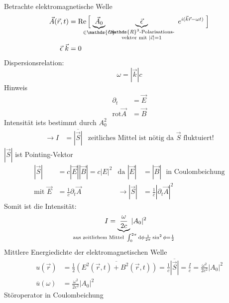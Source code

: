 	Betrachte elektromagnetische Welle
		\begin{align*}
			\vec{A}(\vec{r} , t) &= 
			\mathrm{Re} \left[ \vphantom{ \vec{A}_0 \vec{\epsilon} ~ e^{i(\vec{k} \vec{r} - \omega t)}} \right.
			\underbrace{\vec{A}_0}_{\mathclap{\in \mathds{C}}}
			~ \underbrace{\vec{\epsilon}}_{\substack{\mathds{R}^3 \text{-Polarisations-} \\ \text{vektor mit~} |\vec{\epsilon}| = 1}}
			~ e^{i(\vec{k} \vec{r} - \omega t)}
			\left. \vphantom{ \vec{A}_0 \vec{\epsilon} ~ e^{i(\vec{k} \vec{r} - \omega t)}} \right] \\
			\vec{\epsilon} ~\vec{k} &= 0
		\end{align*}
	Dispersionsrelation: 
		\begin{equation*}
			\omega = |\vec{k}| c
		\end{equation*}
	Hinweis 
		\begin{align*}
			\partial_{t} &= \vec{E} \\
			\mathrm{rot} \vec{A} &= \vec{B}
		\end{align*}
	Intensität ists bestimmt durch $A_0^2$
		\begin{align*}
			\rightarrow I &= \overline{|\vec{S}|} & \text{zeitliches Mittel ist nötig da $\vec{S}$ fluktuiert!}
		\end{align*}
	$| \vec{S} |$ ist Pointing-Vektor 
		\begin{align*}
			| \vec{S} | &= c |\vec{E}| |\vec{B}| = c |E|^2 &\text{da~} |\vec{E}| &= |\vec{B}| \text{~ in Coulombeichung} \\
			\text{mit~} \vec{E} &= \frac{1}{c} \partial_t \vec{A} 
			&\rightarrow |\vec{S}| &= \frac{1}{c} \left|\partial_t \vec{A}\right|^2
		\end{align*}
	Somit ist die Intensität:
		\begin{align*}
			I &= \underbrace{\frac{\omega}{2 c}}_{\mathclap{\text{aus zeitlichem Mittel~} \int_{0}^{2 \pi} \diff \phi \frac{1}{2 \pi} \sin^2 \phi = \frac{1}{2}}}
			|A_0|^2
		\end{align*}
	Mittlere Energiedichte der elektromagnetischen Welle
		\begin{align*}
			u (\vec{r}) &=
			\frac{1}{2} \overline{\left( E^2(\vec{r} , t) + B^2(\vec{r} , t) \right)} 
			= \frac{1}{c} \overline{|\vec{S}|} = 
			\frac{I}{c} = \frac{\omega^2}{2 c^2} |A_0|^2 \\
			\overline{u} (\omega) &= \frac{\omega^2}{2 c^2} |A_0|^2
		\end{align*}
	Störoperator in Coulombeichung
